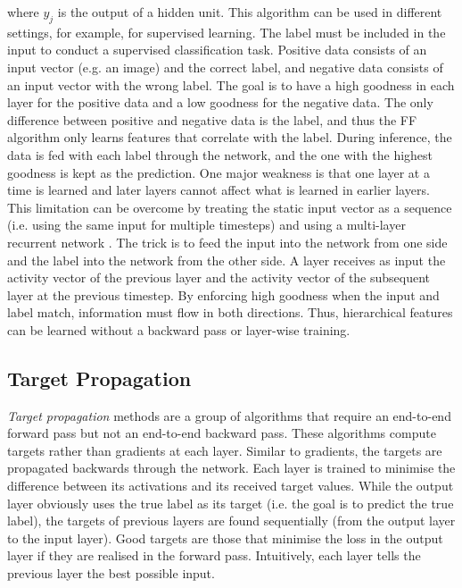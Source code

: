 where $y_j$ is the output of a hidden unit.
This algorithm can be used in different settings, for example, for supervised learning.
The label must be included in the input to conduct a supervised classification task.
Positive data consists of an input vector (e.g. an image) and the correct label, and negative data consists of an input vector with the wrong label.
The goal is to have a high goodness in each layer for the positive data and a low goodness for the negative data.
The only difference between positive and negative data is the label, and thus the FF algorithm only learns features that correlate with the label.
During inference, the data is fed with each label through the network, and the one with the highest goodness is kept as the prediction.
One major weakness is that one layer at a time is learned and later layers cannot affect what is learned in earlier layers.
This limitation can be overcome by treating the static input vector as a sequence (i.e. using the same input for multiple timesteps) and using a multi-layer recurrent network .
The trick is to feed the input into the network from one side and the label into the network from the other side. A layer receives as input the activity vector of the previous layer and the activity vector of the subsequent layer at the previous timestep. By enforcing high goodness when the input and label match, information must flow in both directions. Thus, hierarchical features can be learned without a backward pass or layer-wise training.


\subsection{Target Propagation}
\emph{Target propagation} methods are a group of algorithms that require an end-to-end forward pass but not an end-to-end backward pass.
These algorithms compute targets rather than gradients at each layer.
Similar to gradients, the targets are propagated backwards through the network.
Each layer is trained to minimise the difference between its activations and its received target values.
While the output layer obviously uses the true label as its target (i.e. the goal is to predict the true label), the targets of previous layers are found sequentially (from the output layer to the input layer).
Good targets are those that minimise the loss in the output layer if they are realised in the forward pass.
Intuitively, each layer tells the previous layer the best possible input.

